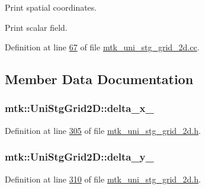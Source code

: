 \begin{DoxyEnumerate}
\item Print spatial coordinates.
\item Print scalar field. 
\end{DoxyEnumerate}

Definition at line \hyperlink{mtk__uni__stg__grid__2d_8cc_source_l00067}{67} of file \hyperlink{mtk__uni__stg__grid__2d_8cc_source}{mtk\+\_\+uni\+\_\+stg\+\_\+grid\+\_\+2d.\+cc}.



\subsection{Member Data Documentation}
\hypertarget{classmtk_1_1UniStgGrid2D_ab1fbb3cf685c51f434488e378564bd2a}{
\subsubsection[{delta\+\_\+x\+\_\+}]{ mtk\+::\+Uni\+Stg\+Grid2\+D\+::delta\+\_\+x\+\_\+\hspace{0.3cm}{\ttfamily [private]}}}\label{classmtk_1_1UniStgGrid2D_ab1fbb3cf685c51f434488e378564bd2a}


Definition at line \hyperlink{mtk__uni__stg__grid__2d_8h_source_l00305}{305} of file \hyperlink{mtk__uni__stg__grid__2d_8h_source}{mtk\+\_\+uni\+\_\+stg\+\_\+grid\+\_\+2d.\+h}.

\hypertarget{classmtk_1_1UniStgGrid2D_ace5af3c991f241a895318b9761db73eb}{
\subsubsection[{delta\+\_\+y\+\_\+}]{ mtk\+::\+Uni\+Stg\+Grid2\+D\+::delta\+\_\+y\+\_\+\hspace{0.3cm}{\ttfamily [private]}}}\label{classmtk_1_1UniStgGrid2D_ace5af3c991f241a895318b9761db73eb}


Definition at line \hyperlink{mtk__uni__stg__grid__2d_8h_source_l00310}{310} of file \hyperlink{mtk__uni__stg__grid__2d_8h_source}{mtk\+\_\+uni\+\_\+stg\+\_\+grid\+\_\+2d.\+h}.

